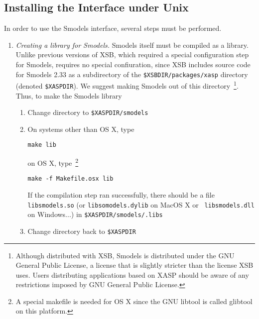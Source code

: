 \subsection{Installing the Interface under Unix}

In order to use the Smodels interface, several steps must be
performed.  

\begin{enumerate}
\item {\em Creating a library for Smodels.} Smodels itself must be
  compiled as a library.  Unlike previous versions of XSB, which
  required a special configuration step for Smodels, \version{}
  requires no special confiuration, since XSB includes source code for
  Smodels 2.33 as a subdirectory of the {\tt \$XSBDIR/packages/xasp}
  directory (denoted {\tt \$XASPDIR}).  We suggest making Smodels out
  of this directory~\footnote{Although distributed with XSB, Smodels
    is distributed under the GNU General Public License, a license
    that is slightly stricter than the license XSB uses.  Users
    distributing applications based on XASP should be aware of any
    restrictions imposed by GNU General Public License.}.  Thus, to
  make the Smodels library
\begin{enumerate}
  \item Change directory to {\tt \$XASPDIR/smodels}
  \item On systems other than OS X, type
\begin{center}
 {\tt make lib}
\end{center}
  on OS X, type~\footnote{A special makefile is needed for OS X since
    the GNU libtool is called glibtool on this platform.}
\begin{center}
 {\tt make -f Makefile.osx lib}
\end{center}
%
%
  If the compilation step ran successfully, there should be a file
  {\tt libsmodels.so} (or {\tt libsomodels.dylib} on MacOS X or {\tt
    libsmodels.dll} on Windows...) in {\tt \$XASPDIR/smodels/.libs}
  \item Change directory back to {\tt \$XASPDIR}
\end{enumerate}



\end{enumerate}
